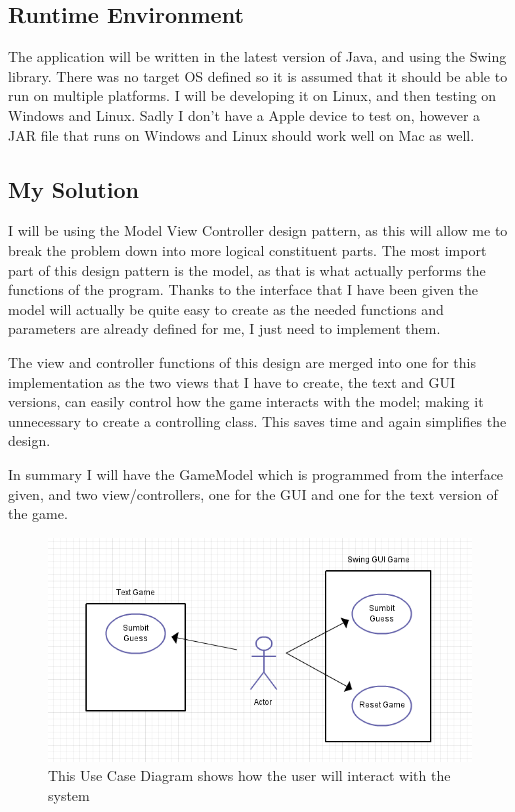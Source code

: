 \documentclass[notitlepage]{report}
\begin{document}
\subsection{Runtime Environment}
The application will be written in the latest version of Java, and using the Swing library. There was no target OS defined so it is assumed that it should be able to run on multiple platforms. I will be developing it on Linux, and then testing on Windows and Linux. Sadly I don't have a Apple device to test on, however a JAR file that runs on Windows and Linux should work well on Mac as well. 

\subsection{My Solution}
I will be using the Model View Controller design pattern, as this will allow me to break the problem down into more logical constituent parts. The most import part of this design pattern is the model, as that is what actually performs the functions of the program. Thanks to the interface that I have been given the model will actually be quite easy to create as the needed functions and parameters are already defined for me, I just need to implement them. 

The view and controller functions of this design are merged into one for this implementation as the two views that I have to create, the text and GUI versions, can easily control how the game interacts with the model; making it unnecessary to create a controlling class. This saves time and again simplifies the design. 

In summary I will have the GameModel which is programmed from the interface given, and two view/controllers, one for the GUI and one for the text version of the game. 


\begin{figure}[!htb]
  \centering
  \includegraphics[scale=0.5]{UseCaseDiagram}
  \caption{This Use Case Diagram shows how the user will interact with the system}
  \label{fig:label}
\end{figure}
\end{document}
